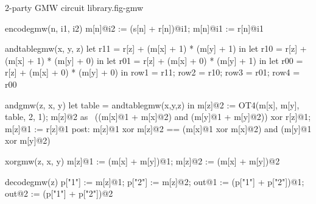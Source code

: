 \begin{fpfig}[t]{2-party GMW circuit library.}{fig-gmw}
{\footnotesize
  \begin{verbatimtab}
encodegmw(n, i1, i2) {
    m[n]@i2 := (s[n] + r[n])@i1;
    m[n]@i1 := r[n]@i1
}

andtablegmw(x, y, z) {
    let r11 = r[z] + (m[x] + 1) * (m[y] + 1) in
    let r10 = r[z] + (m[x] + 1) * (m[y] + 0) in
    let r01 = r[z] + (m[x] + 0) * (m[y] + 1) in
    let r00 = r[z] + (m[x] + 0) * (m[y] + 0) in
    { row1 = r11; row2 = r10; row3 = r01; row4 = r00 }
}

andgmw(z, x, y) {
   let table = andtablegmw(x,y,z) in
   m[z]@2 := OT4(m[x], m[y], table, 2, 1);
   m[z]@2 as ~((m[x]@1 + m[x]@2) and (m[y]@1 + m[y]@2)) xor r[z]@1;
   m[z]@1 := r[z]@1
}
post:
{  m[z]@1 xor m[z]@2 == (m[x]@1 xor m[x]@2) and (m[y]@1 xor m[y]@2) }

xorgmw(z, x, y) {
        m[z]@1 := (m[x] + m[y])@1; m[z]@2 := (m[x] + m[y])@2
}

decodegmw(z) {
        p["1"] := m[z]@1; p["2"] := m[z]@2;
        out@1 := (p["1"] + p["2"])@1;
        out@2 := (p["1"] + p["2"])@2
}
\end{verbatimtab}
}
\end{fpfig}
